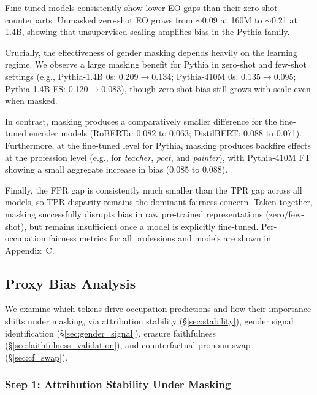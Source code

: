 \documentclass[11pt]{article}
\begin{document}
Fine-tuned models consistently show lower EO gaps than their zero-shot counterparts. Unmasked zero-shot EO grows from $\sim$0.09 at 160M to $\sim$0.21 at 1.4B, showing that unsupervised scaling amplifies bias in the Pythia family.

Crucially, the effectiveness of gender masking depends heavily on the learning regime. We observe a large masking benefit for Pythia in zero-shot and few-shot settings (e.g., Pythia-1.4B 0s: 0.209$\to$0.134; Pythia-410M 0s: 0.135$\to$0.095; Pythia-1.4B FS: 0.120$\to$0.083), though zero-shot bias still grows with scale even when masked.

In contrast, masking produces a comparatively smaller difference for the fine-tuned encoder models (RoBERTa: 0.082 to 0.063; DistilBERT: 0.088 to 0.071). Furthermore, at the fine-tuned level for Pythia, masking produces backfire effects at the profession level (e.g., for \emph{teacher}, \emph{poet}, and \emph{painter}), with Pythia-410M FT showing a small aggregate increase in bias (0.085 to 0.088).

Finally, the FPR gap is consistently much smaller than the TPR gap across all models, so TPR disparity remains the dominant fairness concern. Taken together, masking successfully disrupts bias in raw pre-trained representations (zero/few-shot), but remains insufficient once a model is explicitly fine-tuned.
Per-occupation fairness metrics for all professions and models are shown in Appendix~C.


\subsection{Proxy Bias Analysis}

We examine which tokens drive occupation predictions and how their
importance shifts under masking, via attribution stability
(\S\ref{sec:stability}), gender signal identification
(\S\ref{sec:gender_signal}), erasure faithfulness
(\S\ref{sec:faithfulness_validation}), and counterfactual pronoun swap
(\S\ref{sec:cf_swap}).

\subsubsection*{Step 1: Attribution Stability Under Masking}
\label{sec:stability}
\end{document}
